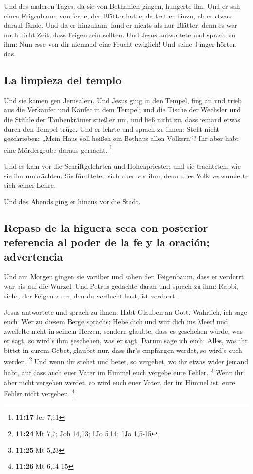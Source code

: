  Und des anderen Tages, da sie von Bethanien gingen,
hungerte ihn.  Und er sah einen Feigenbaum von ferne, der
Blätter hatte; da trat er hinzu, ob er etwas darauf fände. Und da er
hinzukam, fand er nichts als nur Blätter; denn es war noch nicht Zeit,
dass Feigen sein sollten.  Und Jesus antwortete und
sprach zu ihm: Nun esse von dir niemand eine Frucht ewiglich! Und seine
Jünger hörten das.

\hypertarget{la-limpieza-del-templo}{%
\subsection{La limpieza del templo}\label{la-limpieza-del-templo}}

 Und sie kamen gen Jerusalem. Und Jesus ging in den
Tempel, fing an und trieb aus die Verkäufer und Käufer in dem Tempel;
und die Tische der Wechsler und die Stühle der Taubenkrämer stieß er um,
 und ließ nicht zu, dass jemand etwas durch den Tempel
trüge.  Und er lehrte und sprach zu ihnen: Steht nicht
geschrieben: „Mein Haus soll heißen ein Bethaus allen Völkern``? Ihr
aber habt eine Mördergrube daraus gemacht. \footnote{\textbf{11:17} Jer
  7,11}

 Und es kam vor die Schriftgelehrten und Hohenpriester;
und sie trachteten, wie sie ihn umbrächten. Sie fürchteten sich aber vor
ihm; denn alles Volk verwunderte sich seiner Lehre.

 Und des Abends ging er hinaus vor die Stadt.

\hypertarget{repaso-de-la-higuera-seca-con-posterior-referencia-al-poder-de-la-fe-y-la-oraciuxf3n-advertencia}{%
\subsection{Repaso de la higuera seca con posterior referencia al poder
de la fe y la oración;
advertencia}\label{repaso-de-la-higuera-seca-con-posterior-referencia-al-poder-de-la-fe-y-la-oraciuxf3n-advertencia}}

 Und am Morgen gingen sie vorüber und sahen den
Feigenbaum, dass er verdorrt war bis auf die Wurzel.  Und
Petrus gedachte daran und sprach zu ihm: Rabbi, siehe, der Feigenbaum,
den du verflucht hast, ist verdorrt.

 Jesus antwortete und sprach zu ihnen: Habt Glauben an
Gott.  Wahrlich, ich sage euch: Wer zu diesem Berge
spräche: Hebe dich und wirf dich ins Meer! und zweifelte nicht in seinem
Herzen, sondern glaubte, dass es geschehen würde, was er sagt, so wird's
ihm geschehen, was er sagt.  Darum sage ich euch: Alles,
was ihr bittet in eurem Gebet, glaubet nur, dass ihr's empfangen werdet,
so wird's euch werden. \footnote{\textbf{11:24} Mt 7,7; Joh 14,13; 1Jo
  5,14; 1Jo 1,5-15}  Und wenn ihr stehet und betet, so
vergebet, wo ihr etwas wider jemand habt, auf dass auch euer Vater im
Himmel euch vergebe eure Fehler. \footnote{\textbf{11:25} Mt 5,23}
 Wenn ihr aber nicht vergeben werdet, so wird euch euer
Vater, der im Himmel ist, eure Fehler nicht vergeben. \footnote{\textbf{11:26}
  Mt 6,14-15}

